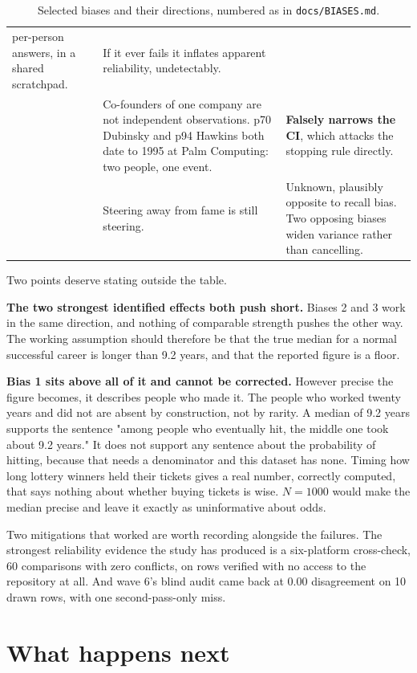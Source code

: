\documentclass[11pt]{article}
\begin{document}
\begin{table}[h]
\begin{tabular}{p{}p{}p{}}
    per-person answers, in a shared scratchpad. & If it ever fails it inflates
    apparent reliability, undetectably. \\
\addlinespace
23 & Co-founders of one company are not independent observations. p70 Dubinsky
    and p94 Hawkins both date to 1995 at Palm Computing: two people, one event.
    & \textbf{Falsely narrows the CI}, which attacks the stopping rule
    directly. \\
\addlinespace
24 & Steering away from fame is still steering. & Unknown, plausibly opposite
    to recall bias. Two opposing biases widen variance rather than cancelling. \\
\bottomrule
\end{tabular}
\caption{Selected biases and their directions, numbered as in
\texttt{docs/BIASES.md}.}
\end{table}

Two points deserve stating outside the table.

\textbf{The two strongest identified effects both push short.} Biases 2 and 3
work in the same direction, and nothing of comparable strength pushes the other
way. The working assumption should therefore be that the true median for a
normal successful career is longer than 9.2 years, and that the reported figure
is a floor.

\textbf{Bias 1 sits above all of it and cannot be corrected.} However precise
the figure becomes, it describes people who made it. The people who worked
twenty years and did not are absent by construction, not by rarity. A median of
9.2 years supports the sentence "among people who eventually hit, the middle
one took about 9.2 years." It does not support any sentence about the
probability of hitting, because that needs a denominator and this dataset has
none. Timing how long lottery winners held their tickets gives a real number,
correctly computed, that says nothing about whether buying tickets is wise.
$N = 1000$ would make the median precise and leave it exactly as uninformative
about odds.

Two mitigations that worked are worth recording alongside the failures. The
strongest reliability evidence the study has produced is a six-platform
cross-check, 60 comparisons with zero conflicts, on rows verified with no
access to the repository at all. And wave 6's blind audit came back at 0.00
disagreement on 10 drawn rows, with one second-pass-only miss.

\section{What happens next}
\end{document}
